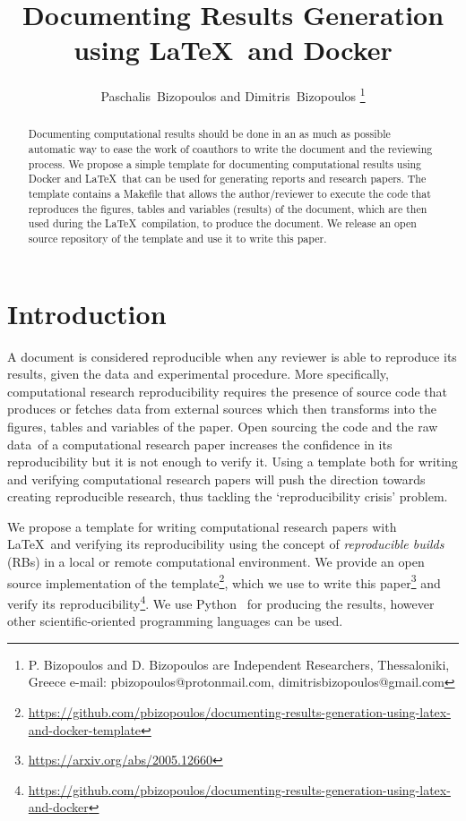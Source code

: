 \documentclass[journal]{IEEEtran}
\begin{document}

\title{Documenting Results Generation using \LaTeX\ and Docker}

\author{Paschalis~Bizopoulos and Dimitris~Bizopoulos
\thanks{P. Bizopoulos and D. Bizopoulos are Independent Researchers, Thessaloniki, Greece e-mail: pbizopoulos@protonmail.com, dimitrisbizopoulos@gmail.com}}

\maketitle

\begin{abstract}
	Documenting computational results should be done in an as much as possible automatic way to ease the work of coauthors to write the document and the reviewing process.
	We propose a simple template for documenting computational results using Docker and \LaTeX\ that can be used for generating reports and research papers.
	The template contains a Makefile that allows the author/reviewer to execute the code that reproduces the figures, tables and variables (results) of the document, which are then used during the \LaTeX\ compilation, to produce the document.
	We release an open source repository of the template and use it to write this paper.
\end{abstract}

\section{Introduction}
A document is considered reproducible when any reviewer is able to reproduce its results, given the data and experimental procedure.
More specifically, computational research reproducibility requires the presence of source code that produces or fetches data from external sources which then transforms into the figures, tables and variables of the paper.
Open sourcing the code and the raw data of a computational research paper increases the confidence in its reproducibility but it is not enough to verify it.
Using a template both for writing and verifying computational research papers will push the direction towards creating reproducible research, thus tackling the `reproducibility crisis' problem.

We propose a template for writing computational research papers with \LaTeX\ and verifying  its reproducibility using the concept of \textit{reproducible builds} (RBs) in a local or remote computational environment.
We provide an open source implementation of the template\footnote{\url{https://github.com/pbizopoulos/documenting-results-generation-using-latex-and-docker-template}}, which we use to write this paper\footnote{\url{https://arxiv.org/abs/2005.12660}} and verify its reproducibility\footnote{\url{https://github.com/pbizopoulos/documenting-results-generation-using-latex-and-docker}}.
We use Python~\cite{van2007python} for producing the results, however other scientific-oriented programming languages can be used.
\end{document}
